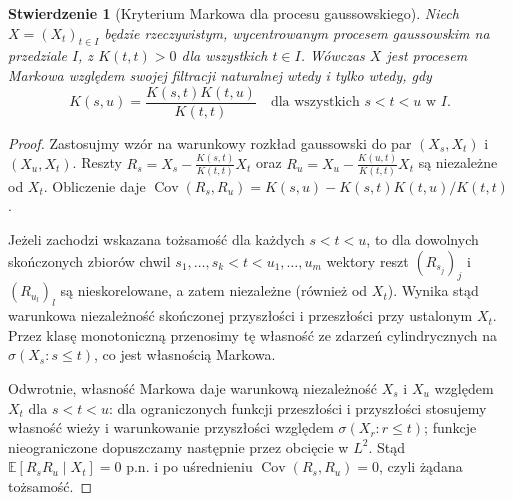 \documentclass[11pt,a4paper,oneside]{report}
\numberwithin{equation}{chapter}
\theoremstyle{plain}
\newtheorem{stwierdzenie}[twierdzenie]{Stwierdzenie}
\theoremstyle{definition}
\theoremstyle{remark}
\newcommand{\E}{\mathbb{E}}
\newcommand{\Cov}{\operatorname{Cov}}
\begin{document}
\begin{stwierdzenie}[Kryterium Markowa dla procesu gaussowskiego]
Niech $X=(X_t)_{t\in I}$ będzie rzeczywistym, wycentrowanym
procesem gaussowskim na przedziale $I$, z $K(t,t)>0$ dla
wszystkich $t\in I$. Wówczas $X$ jest procesem Markowa
względem swojej filtracji naturalnej wtedy i tylko wtedy, gdy
\[
K(s,u)=\frac{K(s,t)K(t,u)}{K(t,t)}
\quad\text{dla wszystkich }s<t<u\text{ w }I.
\]
\end{stwierdzenie}
\begin{proof}
Zastosujmy wzór na warunkowy rozkład gaussowski do par
$(X_s,X_t)$ i $(X_u,X_t)$. Reszty
$R_s=X_s-\frac{K(s,t)}{K(t,t)}X_t$ oraz
$R_u=X_u-\frac{K(u,t)}{K(t,t)}X_t$
są niezależne od $X_t$. Obliczenie daje
$\Cov(R_s,R_u)=K(s,u)-K(s,t)K(t,u)/K(t,t)$.

Jeżeli zachodzi wskazana tożsamość dla każdych $s<t<u$,
to dla dowolnych skończonych zbiorów chwil
$s_1,\ldots,s_k<t<u_1,\ldots,u_m$ wektory reszt
$(R_{s_j})_j$ i $(R_{u_l})_l$ są nieskorelowane, a zatem
niezależne (również od $X_t$). Wynika stąd warunkowa
niezależność skończonej przyszłości i przeszłości przy
ustalonym $X_t$. Przez klasę monotoniczną przenosimy tę
własność ze zdarzeń cylindrycznych na $\sigma(X_s:s\le t)$,
co jest własnością Markowa.

Odwrotnie, własność Markowa daje warunkową niezależność
$X_s$ i $X_u$ względem $X_t$ dla $s<t<u$: dla
ograniczonych funkcji przeszłości i przyszłości stosujemy
własność wieży i warunkowanie przyszłości względem
$\sigma(X_r:r\le t)$; funkcje nieograniczone dopuszczamy
następnie przez obcięcie w $L^2$. Stąd
$\E[R_sR_u\mid X_t]=0$ p.n. i po uśrednieniu
$\Cov(R_s,R_u)=0$, czyli żądana tożsamość.
\end{proof}
\end{document}
